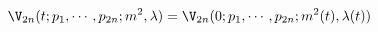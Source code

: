 \begin{equation}
\V_{2n} (t; p_1, \cdots, p_{2n}; m^2, \lambda) = \V_{2n} (0; p_1,
\cdots, p_{2n}; m^2 (t), \lambda (t))
\end{equation}

